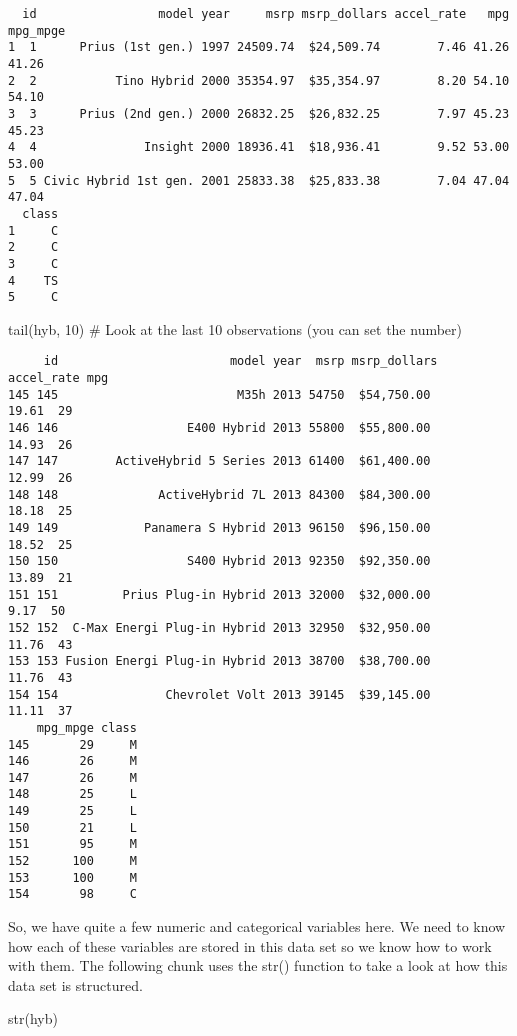 \documentclass[
  letterpaper,
  DIV=11,
  numbers=noendperiod]{scrreprt}
\newenvironment{Shaded}{\begin{snugshade}}{\end{snugshade}}
\newcommand{\CommentTok}[1]{\textcolor[rgb]{0.37,0.37,0.37}{#1}}
\newcommand{\DecValTok}[1]{\textcolor[rgb]{0.68,0.00,0.00}{#1}}
\newcommand{\FunctionTok}[1]{\textcolor[rgb]{0.28,0.35,0.67}{#1}}
\newcommand{\NormalTok}[1]{\textcolor[rgb]{0.00,0.23,0.31}{#1}}
\begin{document}
\begin{verbatim}
  id                 model year     msrp msrp_dollars accel_rate   mpg mpg_mpge
1  1      Prius (1st gen.) 1997 24509.74  $24,509.74        7.46 41.26    41.26
2  2           Tino Hybrid 2000 35354.97  $35,354.97        8.20 54.10    54.10
3  3      Prius (2nd gen.) 2000 26832.25  $26,832.25        7.97 45.23    45.23
4  4               Insight 2000 18936.41  $18,936.41        9.52 53.00    53.00
5  5 Civic Hybrid 1st gen. 2001 25833.38  $25,833.38        7.04 47.04    47.04
  class
1     C
2     C
3     C
4    TS
5     C
\end{verbatim}

\begin{Shaded}
\begin{Highlighting}[]
\FunctionTok{tail}\NormalTok{(hyb, }\DecValTok{10}\NormalTok{) }\CommentTok{\# Look at the last 10 observations (you can set the number)}
\end{Highlighting}
\end{Shaded}

\begin{verbatim}
     id                        model year  msrp msrp_dollars accel_rate mpg
145 145                         M35h 2013 54750  $54,750.00       19.61  29
146 146                  E400 Hybrid 2013 55800  $55,800.00       14.93  26
147 147        ActiveHybrid 5 Series 2013 61400  $61,400.00       12.99  26
148 148              ActiveHybrid 7L 2013 84300  $84,300.00       18.18  25
149 149            Panamera S Hybrid 2013 96150  $96,150.00       18.52  25
150 150                  S400 Hybrid 2013 92350  $92,350.00       13.89  21
151 151         Prius Plug-in Hybrid 2013 32000  $32,000.00        9.17  50
152 152  C-Max Energi Plug-in Hybrid 2013 32950  $32,950.00       11.76  43
153 153 Fusion Energi Plug-in Hybrid 2013 38700  $38,700.00       11.76  43
154 154               Chevrolet Volt 2013 39145  $39,145.00       11.11  37
    mpg_mpge class
145       29     M
146       26     M
147       26     M
148       25     L
149       25     L
150       21     L
151       95     M
152      100     M
153      100     M
154       98     C
\end{verbatim}

So, we have quite a few numeric and categorical variables here. We need
to know how each of these variables are stored in this data set so we
know how to work with them. The following chunk uses the str() function
to take a look at how this data set is structured.

\begin{Shaded}
\begin{Highlighting}[]
\FunctionTok{str}\NormalTok{(hyb)}
\end{Highlighting}
\end{Shaded}
\end{document}
